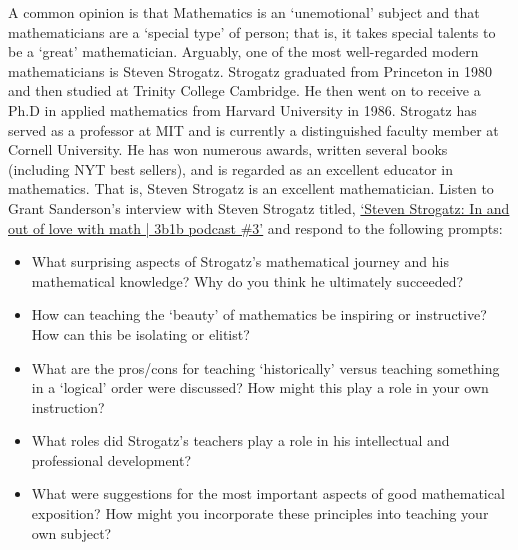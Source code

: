 \documentclass[11pt,letterpaper]{article}
\begin{document}

A common opinion is that Mathematics is an `unemotional' subject and that mathematicians are a `special type' of person; that is, it takes special talents to be a `great' mathematician. Arguably, one of the most well-regarded modern mathematicians is Steven Strogatz. Strogatz graduated from Princeton in 1980 and then studied at Trinity College Cambridge. He then went on to receive a Ph.D in applied mathematics from Harvard University in 1986. Strogatz has served as a professor at MIT and is currently a distinguished faculty member at Cornell University. He has won numerous awards, written several books (including  NYT best sellers), and is regarded as an excellent educator in mathematics. That is, Steven Strogatz is an excellent mathematician. Listen to Grant Sanderson's interview with Steven Strogatz titled, \href{https://www.youtube.com/watch?v=SUMLKweFAYk&ab_channel=GrantSanderson}{`Steven Strogatz: In and out of love with math | 3b1b podcast \#3'} and respond to the following prompts:
	\begin{itemize}
	\item What surprising aspects of Strogatz's mathematical journey and his mathematical knowledge? Why do you think he ultimately succeeded?
	\item How can teaching the `beauty' of mathematics be inspiring or instructive? How can this be isolating or elitist? 
	\item What are the pros/cons for teaching `historically' versus teaching something in a `logical' order were discussed? How might this play a role in your own instruction?
	\item What roles did Strogatz's teachers play a role in his intellectual and professional development?
	\item What were suggestions for the most important aspects of good mathematical exposition? How might you incorporate these principles into teaching your own subject?
	\end{itemize}

\newpage

\phantom{.}
\end{document}
